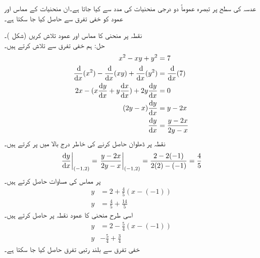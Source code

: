 عدسہ کی سطح پر تبصرہ عموماً دو درجی منحنیات کی مدد سے کیا جاتا ہے۔ان منحنیات کے مماس اور عمود کو خفی تفرق سے حاصل کیا جا سکتا ہے۔

نقطہ  پر منحنی  کا مماس اور عمود تلاش کریں (شکل )۔\\
حل:\quad
ہم خفی تفرق سے  تلاش کرتے ہیں۔
\begin{align*}
x^2-xy+y^2&=7\\
\frac{\dif}{\dif x}(x^2)-\frac{\dif}{\dif x}(xy)+\frac{\dif}{\dif x}(y^2)&=\frac{\dif}{\dif x}(7)\\
2x-(x\frac{\dif y}{\dif x}+y\frac{\dif x}{\dif x})+2y\frac{\dif y}{\dif x}&=0\\
(2y-x)\frac{\dif y}{\dif x}&=y-2x\\
\frac{\dif y}{\dif x}&=\frac{y-2x}{2y-x}
\end{align*}
نقطہ  پر ڈھلوان حاصل کرنے کی خاطر درج بالا میں  پر کرتے ہیں۔
\begin{align*}
\left.\frac{\dif y}{\dif x}\right|_{(-1,2)}=\left. \frac{y-2x}{2y-x}\right|_{(-1,2)}=\frac{2-2(-1)}{2(2)-(-1)}=\frac{4}{5}
\end{align*}
 پر مماس کی مساوات حاصل کرتے ہیں۔
\begin{align*}
y&=2+\frac{4}{5}(x-(-1))\\
y&=\frac{4}{5}+\frac{14}{5}
\end{align*}
اسی طرح منحنی کا عمود نقطہ  پر حاصل کرتے ہیں۔
\begin{align*}
y&=2-\frac{5}{4}(x-(-1))\\
y&-\frac{5}{4}+\frac{3}{4}
\end{align*}
خفی تفرق سے بلند رتبی تفرق حاصل کیا جا سکتا ہے۔

